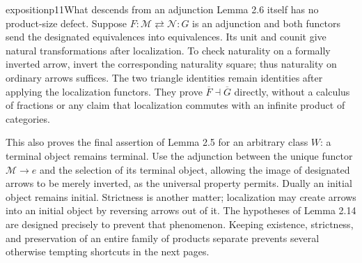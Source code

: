 \begin{dcomment}{exposition}{p11}{What descends from an adjunction}
Lemma 2.6 itself has no product-size defect. Suppose $F:\mathcal M\rightleftarrows\mathcal N:G$ is an adjunction and both functors send the designated equivalences into equivalences. Its unit and counit give natural transformations after localization. To check naturality on a formally inverted arrow, invert the corresponding naturality square; thus naturality on ordinary arrows suffices. The two triangle identities remain identities after applying the localization functors. They prove $\overline F\dashv\overline G$ directly, without a calculus of fractions or any claim that localization commutes with an infinite product of categories.

This also proves the final assertion of Lemma 2.5 for an arbitrary class $W$: a terminal object remains terminal. Use the adjunction between the unique functor $\mathcal M\to e$ and the selection of its terminal object, allowing the image of designated arrows to be merely inverted, as the universal property permits. Dually an initial object remains initial. Strictness is another matter; localization may create arrows into an initial object by reversing arrows out of it. The hypotheses of Lemma 2.14 are designed precisely to prevent that phenomenon. Keeping existence, strictness, and preservation of an entire family of products separate prevents several otherwise tempting shortcuts in the next pages.
\end{dcomment}

